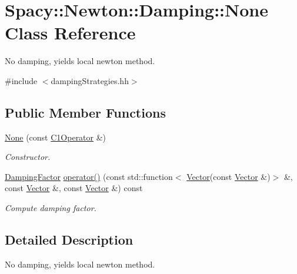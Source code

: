 \hypertarget{classSpacy_1_1Newton_1_1Damping_1_1None}{\section{\-Spacy\-:\-:\-Newton\-:\-:\-Damping\-:\-:\-None \-Class \-Reference}
\label{classSpacy_1_1Newton_1_1Damping_1_1None}
}


\-No damping, yields local newton method.  




{\ttfamily \#include $<$damping\-Strategies.\-hh$>$}

\subsection*{\-Public \-Member \-Functions}
\begin{DoxyCompactItemize}
\item 
\hypertarget{classSpacy_1_1Newton_1_1Damping_1_1None_ac153c7288c074756c6c3eeb8f91eddd4}{\hyperlink{classSpacy_1_1Newton_1_1Damping_1_1None_ac153c7288c074756c6c3eeb8f91eddd4}{\-None} (const \hyperlink{classSpacy_1_1C1Operator}{\-C1\-Operator} \&)}\label{classSpacy_1_1Newton_1_1Damping_1_1None_ac153c7288c074756c6c3eeb8f91eddd4}

\begin{DoxyCompactList}\small\item\em \-Constructor. \end{DoxyCompactList}\item 
\hyperlink{classSpacy_1_1DampingFactor}{\-Damping\-Factor} \hyperlink{classSpacy_1_1Newton_1_1Damping_1_1None_a79351f9d5d55c598f6723aa0e5ff8ff3}{operator()} (const std\-::function$<$ \hyperlink{classSpacy_1_1Vector}{\-Vector}(const \hyperlink{classSpacy_1_1Vector}{\-Vector} \&)$>$ \&, const \hyperlink{classSpacy_1_1Vector}{\-Vector} \&, const \hyperlink{classSpacy_1_1Vector}{\-Vector} \&) const 
\begin{DoxyCompactList}\small\item\em \-Compute damping factor. \end{DoxyCompactList}\end{DoxyCompactItemize}


\subsection{\-Detailed \-Description}
\-No damping, yields local newton method. 


